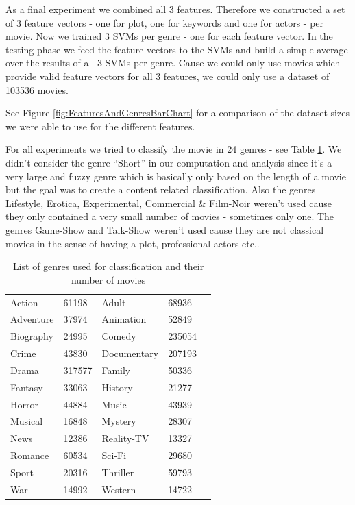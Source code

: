 \documentclass{vldb}
\begin{document}
\par As a final experiment we combined all 3 features. Therefore we constructed a set of 3 feature vectors - one for plot, one for keywords and one for actors - per movie. Now we trained 3 SVMs per genre - one for each feature vector. In the testing phase we feed the feature vectors to the SVMs and build a simple average over the results of all 3 SVMs per genre. Cause we could only use movies which provide valid feature vectors for all 3 features, we could only use a dataset of 103536 movies.

\par See Figure \ref{fig:FeaturesAndGenresBarChart} for a comparison of the dataset sizes we were able to use for the different features.

\par For all experiments we tried to classify the movie in 24 genres - see Table \ref{genre-list}. We didn’t consider the genre “Short” in our computation and analysis since it’s a very large and fuzzy genre which is basically only based on the length of a movie but the goal was to create a content related classification. Also the genres Lifestyle, Erotica, Experimental, Commercial \& Film-Noir weren't used cause they only contained a very small number of movies - sometimes only one. The genres Game-Show and Talk-Show weren't used cause they are not classical movies in the sense of having a plot, professional actors etc..

\begin{table}[]
\centering
\caption{List of genres used for classification and their number of movies}
\label{genre-list}
\begin{tabular}{lllll}
Action & 61198 & Adult & 68936\\
Adventure & 37974 & Animation & 52849\\
Biography & 24995 & Comedy & 235054\\
Crime & 43830 & Documentary & 207193\\
Drama & 317577 & Family & 50336\\
Fantasy & 33063 & History & 21277\\
Horror & 44884 & Music & 43939\\
Musical & 16848 & Mystery & 28307\\
News & 12386 & Reality-TV & 13327\\
Romance & 60534 & Sci-Fi & 29680\\
Sport & 20316 & Thriller & 59793\\
War & 14992 & Western & 14722\\
\end{tabular}
\end{table}
\end{document}
